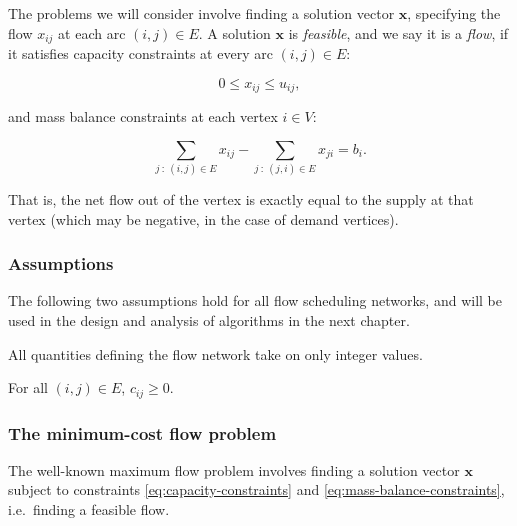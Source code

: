 The problems we will consider involve finding a solution vector $\mathbf{x}$,
specifying the flow $x_{ij}$ at each arc $(i,j)\in E$. A solution
$\mathbf{x}$ is \emph{feasible}, and we say it is a \emph{flow}, if it satisfies capacity constraints at every arc $(i,j) \in E$:

\begin{equation} \label{eq:capacity-constraints}
0\leq x_{ij}\leq u_{ij},
\end{equation}

and mass balance constraints at each vertex $i \in V$:

\begin{equation} \label{eq:mass-balance-constraints}
\sum_{j\::\:(i,j)\in E}x_{ij}-\sum_{j\::\:(j,i)\in E}x_{ji}=b_i.
\end{equation}

That is, the net flow out of the vertex is exactly equal to the supply
at that vertex (which may be negative, in the case of demand vertices).

\subsubsection{Assumptions}

The following two assumptions hold for all flow scheduling networks, and will be used in the design and analysis of algorithms in the next chapter.

\begin{assumption}[Integrality] \label{assumption:integrality}
All quantities defining the flow network take on only integer values.\\
\end{assumption}

\begin{assumption} \label{assumption:non-negative-arc-costs}
For all $(i,j) \in E$, $c_{ij} \geq 0$. \\
\end{assumption}

\subsubsection{The minimum-cost flow problem} \label{sec:prep-flow-mcf}

The well-known maximum flow problem involves finding a solution vector
$\mathbf{x}$ subject to constraints \cref{eq:capacity-constraints} and \cref{eq:mass-balance-constraints}, i.e.\ finding a feasible flow.

